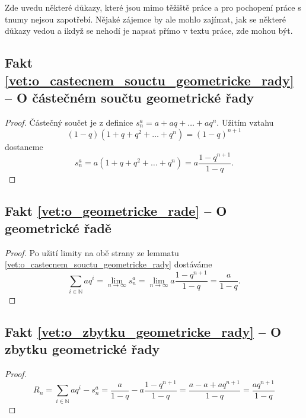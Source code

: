 Zde uvedu některé důkazy, které jsou mimo těžiště práce a pro pochopení práce s tnumy nejsou zapotřebí. Nějaké zájemce by ale mohlo zajímat, jak se některé důkazy vedou a ikdyž se nehodí je napsat přímo v textu práce, zde mohou být.
\subsection{Fakt \ref{vet:o_castecnem_souctu_geometricke_rady} -- O částečném součtu geometrické řady}\label{duk:o_castecnem_souctu_geometricke_rady}
\begin{proof}
Částečný součet je z definice $s^a_n=a+aq+\ldots+aq^n$. Užitím vztahu
\begin{equation}
(1-q)(1+q+q^2+\ldots+q^n)=(1-q)^{n+1}
\end{equation}
dostaneme
\begin{equation}
s^a_n=a(1+q+q^2+\ldots+q^n)=a\frac{1-q^{n+1}}{1-q}.
\end{equation}
\end{proof}

\subsection{Fakt \ref{vet:o_geometricke_rade} -- O geometrické řadě}\label{duk:o_geometricke_rade}
\begin{proof}
Po užití limity na obě strany ze lemmatu \ref{vet:o_castecnem_souctu_geometricke_rady} dostáváme 
\begin{equation}
\sum_{i\in\mathbb{N}}aq^i=\lim_{n\to\infty}s^a_n=\lim_{n\to\infty}a\frac{1-q^{n+1}}{1-q}=\frac{a}{1-q}.
\end{equation}
\end{proof}

\subsection{Fakt \ref{vet:o_zbytku_geometricke_rady} -- O zbytku geometrické řady}\label{duk:o_zbytku_geometricke_rady}	
\begin{proof}
\begin{equation}
R_n = \sum_{i\in\mathbb{N}}aq^i -s^a_n =\frac{a}{1-q} - a\frac{1-q^{n+1}}{1-q} = \frac{a-a+aq^{n+1}}{1-q} = \frac{aq^{n+1}}{1-q}
\end{equation}
\end{proof}

